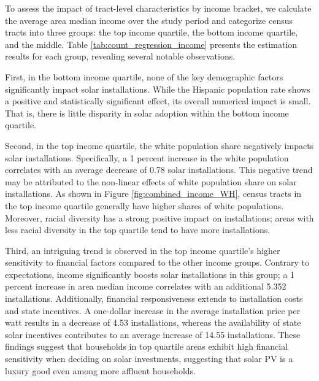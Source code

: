 \documentclass[11pt,twoside,letterpaper]{article}
\begin{document}
To assess the impact of tract-level characteristics by income bracket, we calculate the average area median income over the study period and categorize census tracts into three groups: the top income quartile, the bottom income quartile, and the middle. Table \ref{tab:count_regression_income} presents the estimation results for each group, revealing several notable observations.

First, in the bottom income quartile, none of the key demographic factors significantly impact solar installations. While the Hispanic population rate shows a positive and statistically significant effect, its overall numerical impact is small. That is, there is little disparity in solar adoption within the bottom income quartile. 

Second, in the top income quartile, the white population share negatively impacts solar installations. Specifically, a 1 percent increase in the white population correlates with an average decrease of 0.78 solar installations. This negative trend may be attributed to the non-linear effects of white population share on solar installations. As shown in Figure \ref{fig:combined_income_WH}, census tracts in the top income quartile generally have higher shares of white populations. Moreover, racial diversity has a strong positive impact on installations; areas with less racial diversity in the top quartile tend to have more installations.

Third, an intriguing trend is observed in the top income quartile’s higher sensitivity to financial factors compared to the other income groups. Contrary to expectations, income significantly boosts solar installations in this group; a 1 percent increase in area median income correlates with an additional 5.352 installations. Additionally, financial responsiveness extends to installation costs and state incentives. A one-dollar increase in the average installation price per watt results in a decrease of 4.53 installations, whereas the availability of state solar incentives contributes to an average increase of 14.55 installations. These findings suggest that households in top quartile areas exhibit high financial sensitivity when deciding on solar investments, suggesting that solar PV is a luxury good even among more affluent households.


\end{document}
